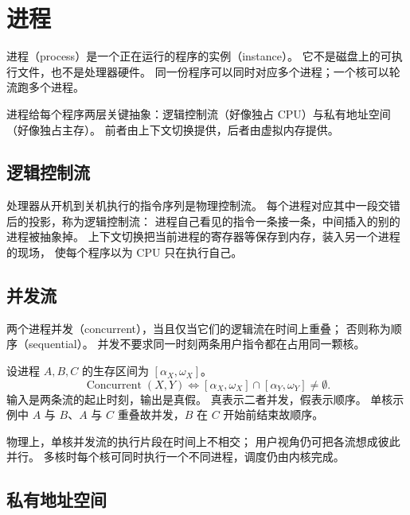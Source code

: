 \section{进程}

进程（process）是一个正在运行的程序的实例（instance）。
它不是磁盘上的可执行文件，也不是处理器硬件。
同一份程序可以同时对应多个进程；一个核可以轮流跑多个进程。


进程给每个程序两层关键抽象：逻辑控制流（好像独占 CPU）与私有地址空间（好像独占主存）。
前者由上下文切换提供，后者由虚拟内存提供。

\subsection{逻辑控制流}

处理器从开机到关机执行的指令序列是物理控制流。
每个进程对应其中一段交错后的投影，称为逻辑控制流：
进程自己看见的指令一条接一条，中间插入的别的进程被抽象掉。
上下文切换把当前进程的寄存器等保存到内存，装入另一个进程的现场，
使每个程序以为 CPU 只在执行自己。

\subsection{并发流}

两个进程并发（concurrent），当且仅当它们的逻辑流在时间上重叠；
否则称为顺序（sequential）。
并发不要求同一时刻两条用户指令都在占用同一颗核。


设进程 $A,B,C$ 的生存区间为 $[\alpha_X,\omega_X]$。
\[
\operatorname{Concurrent}(X,Y)
\iff
[\alpha_X,\omega_X]\cap[\alpha_Y,\omega_Y]\neq\emptyset.
\]
输入是两条流的起止时刻，输出是真假。
真表示二者并发，假表示顺序。
单核示例中 $A$ 与 $B$、$A$ 与 $C$ 重叠故并发，$B$ 在 $C$ 开始前结束故顺序。

物理上，单核并发流的执行片段在时间上不相交；
用户视角仍可把各流想成彼此并行。
多核时每个核可同时执行一个不同进程，调度仍由内核完成。

\subsection{私有地址空间}

